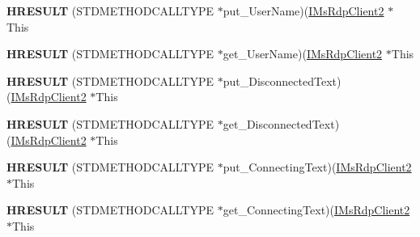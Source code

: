 \begin{DoxyCompactItemize}
\item 
\mbox{\label{struct_m_s_t_s_c_lib_1_1_i_ms_rdp_client2_vtbl_a698bcabb20eeda8da1d947e3afc2189f}} 
{\bfseries H\+R\+E\+S\+U\+LT} (S\+T\+D\+M\+E\+T\+H\+O\+D\+C\+A\+L\+L\+T\+Y\+PE $\ast$put\+\_\+\+User\+Name)(\hyperlink{interface_m_s_t_s_c_lib_1_1_i_ms_rdp_client2}{I\+Ms\+Rdp\+Client2} $\ast$This
\item 
\mbox{\label{struct_m_s_t_s_c_lib_1_1_i_ms_rdp_client2_vtbl_ad894345655c40fbab9abcc4ec3676c2d}} 
{\bfseries H\+R\+E\+S\+U\+LT} (S\+T\+D\+M\+E\+T\+H\+O\+D\+C\+A\+L\+L\+T\+Y\+PE $\ast$get\+\_\+\+User\+Name)(\hyperlink{interface_m_s_t_s_c_lib_1_1_i_ms_rdp_client2}{I\+Ms\+Rdp\+Client2} $\ast$This
\item 
\mbox{\label{struct_m_s_t_s_c_lib_1_1_i_ms_rdp_client2_vtbl_aa23d27d7ab902a22cbfb668ec0ff7fd7}} 
{\bfseries H\+R\+E\+S\+U\+LT} (S\+T\+D\+M\+E\+T\+H\+O\+D\+C\+A\+L\+L\+T\+Y\+PE $\ast$put\+\_\+\+Disconnected\+Text)(\hyperlink{interface_m_s_t_s_c_lib_1_1_i_ms_rdp_client2}{I\+Ms\+Rdp\+Client2} $\ast$This
\item 
\mbox{\label{struct_m_s_t_s_c_lib_1_1_i_ms_rdp_client2_vtbl_af528177d5ba285f33e6370583bc1be08}} 
{\bfseries H\+R\+E\+S\+U\+LT} (S\+T\+D\+M\+E\+T\+H\+O\+D\+C\+A\+L\+L\+T\+Y\+PE $\ast$get\+\_\+\+Disconnected\+Text)(\hyperlink{interface_m_s_t_s_c_lib_1_1_i_ms_rdp_client2}{I\+Ms\+Rdp\+Client2} $\ast$This
\item 
\mbox{\label{struct_m_s_t_s_c_lib_1_1_i_ms_rdp_client2_vtbl_aee8aa16ec2a1cc52c1b5d9badd3b6079}} 
{\bfseries H\+R\+E\+S\+U\+LT} (S\+T\+D\+M\+E\+T\+H\+O\+D\+C\+A\+L\+L\+T\+Y\+PE $\ast$put\+\_\+\+Connecting\+Text)(\hyperlink{interface_m_s_t_s_c_lib_1_1_i_ms_rdp_client2}{I\+Ms\+Rdp\+Client2} $\ast$This
\item 
\mbox{\label{struct_m_s_t_s_c_lib_1_1_i_ms_rdp_client2_vtbl_a5e4e40e18bb69e5d64c28bd2d57b1ce6}} 
{\bfseries H\+R\+E\+S\+U\+LT} (S\+T\+D\+M\+E\+T\+H\+O\+D\+C\+A\+L\+L\+T\+Y\+PE $\ast$get\+\_\+\+Connecting\+Text)(\hyperlink{interface_m_s_t_s_c_lib_1_1_i_ms_rdp_client2}{I\+Ms\+Rdp\+Client2} $\ast$This

\end{DoxyCompactItemize}
